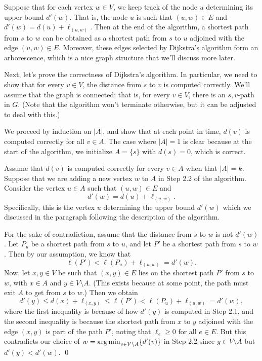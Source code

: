 Suppose that for each vertex $w \in V$, we keep track of the node $u$ 
determining its upper bound $d'(w)$. That is, the node $u$ is such that 
$(u, w) \in E$ and $d'(w) = d(u) + \ell_{(u, w)}$. Then at the end of the 
algorithm, a shortest path from $s$ to $w$ can be obtained as a shortest path 
from $s$ to $u$ adjoined with the edge $(u, w) \in E$. Moreover, these edges 
selected by Dijkstra's algorithm form an arborescence, which is a nice graph 
structure that we'll discuss more later. 

Next, let's prove the correctness of Dijkstra's algorithm. In particular, 
we need to show that for every $v \in V$, the distance from $s$ to $v$ 
is computed correctly. We'll assume that the graph is connected; that is, 
for every $v \in V$, there is an $s, v$-path in $G$. (Note that the 
algorithm won't terminate otherwise, but it can be adjusted to deal 
with this.)

\begin{pf}
    We proceed by induction on $|A|$, and show that at each point in time, 
    $d(v)$ is computed correctly for all $v \in A$. The case where $|A| = 1$ 
    is clear because at the start of the algorithm, we initialize $A = \{s\}$ 
    with $d(s) = 0$, which is correct. 

    Assume that $d(v)$ is computed correctly for every $v \in A$ when 
    that $|A| = k$. Suppose that we are adding a new vertex $w$ to $A$ 
    in Step 2.2 of the algorithm. Consider the vertex $u \in A$ such that 
    $(u, w) \in E$ and 
    \[ d'(w) = d(u) + \ell_{(u, w)}. \] 
    Specifically, this is the vertex $u$ determining the upper bound 
    $d'(w)$ which we discussed in the paragraph following the description 
    of the algorithm. 

    For the sake of contradiction, assume that the distance from $s$ to $w$ 
    is not $d'(w)$. Let $P_u$ be a shortest path from $s$ to $u$, and 
    let $P'$ be a shortest path from $s$ to $w$. Then by our 
    assumption, we know that 
    \[ \ell(P') < \ell(P_u) + \ell_{(u, w)} = d'(w). \] 
    Now, let $x, y \in V$ be such that $(x, y) \in E$ lies on the shortest 
    path $P'$ from $s$ to $w$, with $x \in A$ and $y \in V \setminus A$. 
    (This exists because at some point, the path must exit $A$ to get 
    from $s$ to $w$.) Then we obtain 
    \[ d'(y) \leq d(x) + \ell_{(x,y)} \leq \ell(P') < \ell(P_u) 
    + \ell_{(u, w)} = d'(w), \] 
    where the first inequality is because of how $d'(y)$ is computed in 
    Step 2.1, and the second inequality is because the shortest path 
    from $x$ to $y$ adjoined with the edge $(x, y)$ is part of the path $P'$, 
    noting that $\ell_e \geq 0$ for all $e \in E$. But this contradicts 
    our choice of $w = \operatorname*{arg\,min}_{v\in V \setminus A} \{d'(v)\}$ in Step 2.2 
    since $y \in V \setminus A$ but $d'(y) < d'(w)$. \qed
\end{pf}